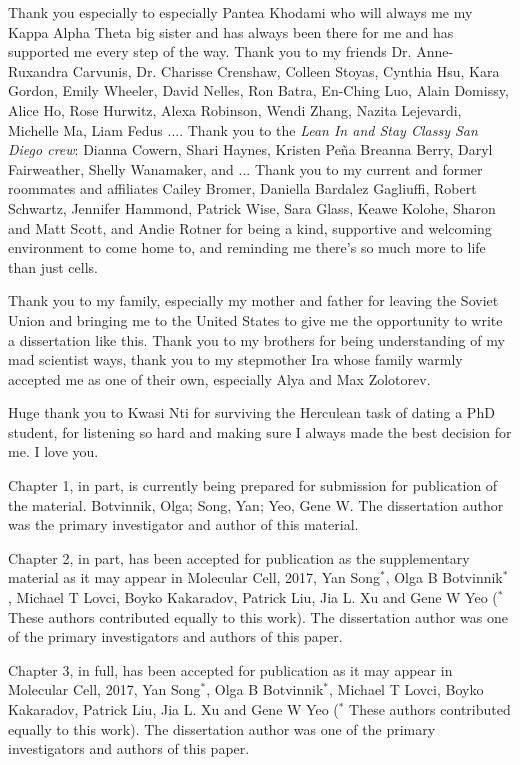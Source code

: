 \begin{frontmatter}
\begin{acknowledgements}
Thank you especially to especially Pantea Khodami who will always me my Kappa Alpha Theta big sister and has always been there for me and has supported me every step of the way. Thank you to my friends Dr. Anne-Ruxandra Carvunis, Dr. Charisse Crenshaw, Colleen Stoyas, Cynthia Hsu, Kara Gordon, Emily Wheeler, David Nelles, Ron Batra, En-Ching Luo, Alain Domissy, Alice Ho, Rose Hurwitz, Alexa Robinson, Wendi Zhang, Nazita Lejevardi, Michelle Ma, Liam Fedus .... Thank you to the \emph{Lean In and Stay Classy San Diego crew}: Dianna Cowern, Shari Haynes, Kristen Pe\~na Breanna Berry, Daryl Fairweather, Shelly Wanamaker, and ... Thank you to my current and former roommates and affiliates Cailey Bromer, Daniella Bardalez Gagliuffi, Robert Schwartz, Jennifer Hammond, Patrick Wise, Sara Glass, Keawe Kolohe, Sharon and Matt Scott, and Andie Rotner for being a kind, supportive and welcoming environment to come home to, and reminding me there's so much more to life than just cells.

Thank you to my family, especially my mother and father for leaving the Soviet Union and bringing me to the United States to give me the opportunity to write a dissertation like this. Thank you to my brothers for being understanding of my mad scientist ways, thank you to my stepmother Ira whose family warmly accepted me as one of their own, especially Alya and Max Zolotorev.

Huge thank you to Kwasi Nti for surviving the Herculean task of dating a PhD student, for listening so hard and making sure I always made the best decision for me. I love you.

Chapter 1, in part, is currently being prepared for submission for publication of the material. Botvinnik, Olga; Song, Yan; Yeo, Gene W. The dissertation author was the primary investigator and author of this material. 
 
Chapter 2, in part, has been accepted for publication as the supplementary material as it may appear in Molecular Cell, 2017, Yan Song$^*$, Olga B Botvinnik$^*$, Michael T Lovci, Boyko Kakaradov, Patrick Liu, Jia L. Xu and Gene W Yeo ($^*$ These authors contributed equally to this work).  The dissertation author was one of the primary investigators and authors of this paper. 

Chapter 3, in full, has been accepted for publication as it may appear in Molecular Cell, 2017, Yan Song$^*$, Olga B Botvinnik$^*$, Michael T Lovci, Boyko Kakaradov, Patrick Liu, Jia L. Xu and Gene W Yeo ($^*$ These authors contributed equally to this work).  The dissertation author was one of the primary investigators and authors of this paper. 


\end{acknowledgements}
\end{frontmatter}
